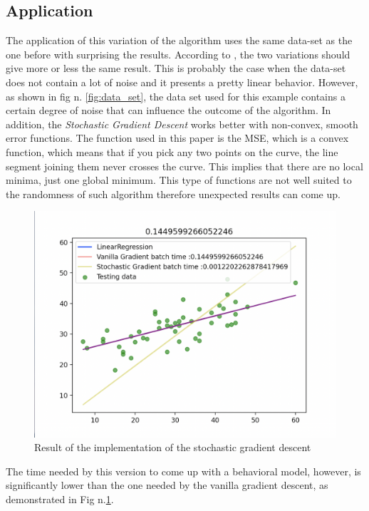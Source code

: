 \documentclass[conference]{IEEEtran}
\begin{document}
\subsection{Application}
The application of this variation of the algorithm uses the same data-set as the one before with surprising the results. 
According to  \cite{Scikit-Learn},  the two variations should give more or less the same result. This is probably the case when the data-set does not contain a lot of noise and it presents a pretty linear behavior. However, as shown in fig n. \ref{fig:data_set}, the data set used for this example contains a certain degree of noise that can influence the outcome of the algorithm. 
In addition, the \textit{Stochastic Gradient Descent} works better with non-convex, smooth error functions. The function used in this paper is the MSE, which is a convex function, which means that if you pick any two points on the curve, the line segment joining them never crosses the curve. This implies that there are no local minima, just one global minimum.\cite{Scikit-Learn}  This type of functions are not well suited to the randomness of such algorithm therefore unexpected results can come up. 
\begin{figure}[htbp]
    \includegraphics[scale=0.4]{Figures/Schermata 2021-05-01 alle 18.53.24.png}
    \caption{Result of the implementation of the stochastic gradient descent}
    \label{fig:stoc_res}
\end{figure}
The time needed by this version to come up with a behavioral model, however, is significantly lower than the one needed by the vanilla gradient descent, as demonstrated in Fig n.\ref{fig:stoc_res}.
\end{document}
